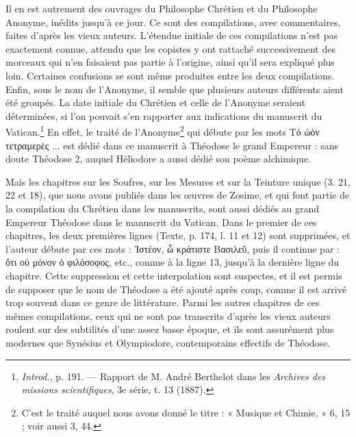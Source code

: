 \documentclass[a4paper, 11pt, oneside, polutonikogreek, french]{article}
\begin{document}
Il en est autrement des ouvrages du Philosophe Chrétien et du Philosophe Anonyme, inédits jusqu'à ce jour. Ce sont des compilations, avec commentaires, faites d'après les vieux auteurs. L'étendue initiale de ces compilations n'est pas exactement connue, attendu que les copistes y ont rattaché successivement des morceaux qui n'en faisaient pas partie à l'origine, ainsi qu'il sera expliqué plus loin. Certaines confusions se sont même produites entre les deux compilations. Enfin, sous le nom de l'Anonyme, il semble que plusieurs auteurs différents aient été groupés. La date initiale du Chrétien et celle de l'Anonyme seraient déterminées, si l'on pouvait s'en rapporter aux indications du manuscrit du Vatican.\footnote{\emph{Introd.}, p. 191. --- Rapport de M. André Berthelot dans les \emph{Archives des missions scientifiques}, 3e série, t. 13 (1887).} En effet, le traité de l'Anonyme\footnote{C'est le traité auquel nous avons donné le titre : « Musique et Chimie, » 6, 15 ; voir aussi 3, 44.} qui débute par les mots Τὸ ὠὸν τετραμερὲς ... est dédié dans ce manuscrit à Théodose le grand Empereur : sans doute Théodose 2, auquel Héliodore a aussi dédié son poème alchimique.

Mais les chapitres sur les Soufres, sur les Mesures et sur la Teinture unique (3. 21, 22 et 18), que nous avons publiés dans les œuvres de Zosime, et qui font partie de la compilation du Chrétien dans les manuscrits, sont aussi dédiés au grand Empereur Théodose dans le manuscrit du Vatican. Dans le premier de ces chapitres, les deux premières lignes (Texte, p. 174, l. 11 et 12) sont supprimées, et l'auteur débute par ces mots : Ἰστέον, ὧ κράτιστε Βασιλεῦ, puis il continue par : ὅτι οὐ μόνον ὁ φιλόσοφος, etc., comme à la ligne 13, jusqu'à la dernière ligne du chapitre. Cette suppression et cette interpolation sont suspectes, et il est permis de supposer que le nom de Théodose a été ajouté après coup, comme il est arrivé trop souvent dans ce genre de littérature. Parmi les autres chapitres de ces mêmes compilations, ceux qui ne sont pas transcrits d'après les vieux auteurs roulent sur des subtilités d'une assez basse époque, et ils sont assurément plus modernes que Synésius et Olympiodore, contemporains effectifs de Théodose.
\end{document}
